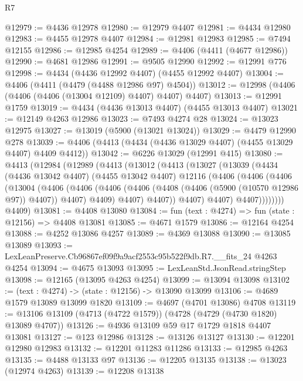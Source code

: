 \begin{lexlean}{R7}
\begin{coremodule}
@12979 := @4436 @12978
@12980 := @12979 @4407
@12981 := @4434 @12980
@12983 := @4455 @12978 @4407
@12984 := @12981 @12983
@12985 := @7494 @12155
@12986 := @12985 @4254
@12989 := @4406 (@4411 (@4677 @12986))
@12990 := @4681 @12986
@12991 := @9505 @12990
@12992 := @12991 @776
@12998 := @4434 (@4436 @12992 @4407) (@4455 @12992 @4407)
@13004 := @4406 (@4411 (@4479 (@4488 @12986 @97) @4504))
@13012 := @12998 (@4406 (@4406 (@4406 (@13004 @12109) @4407) @4407) @4407)
@13013 := @12991 @1759
@13019 := @4434 (@4436 @13013 @4407) (@4455 @13013 @4407)
@13021 := @12149 @4263 @12986
@13023 := @7493 @4274 @28
@13024 := @13023 @12975
@13027 := @13019 (@5900 (@13021 @13024))
@13029 := @4479 @12990 @278
@13039 := @4406 (@4413 (@4434 (@4436 @13029 @4407) (@4455 @13029 @4407) @4409 @4412))
@13042 := @6226 @13029 (@12991 @415)
@13080 := @4413
    (@12984
      (@12989
        (@4413
          (@13012
            (@4413
              (@13027
                (@13039
                  (@4434
                    (@4436 @13042 @4407)
                    (@4455 @13042 @4407)
                    @12116
                    (@4406
                      (@4406
                        (@4406
                          (@13004
                            (@4406
                              (@4406
                                (@4406
                                  (@4406 (@4408 (@4406 (@5900 (@10570 @12986 @97)) @4407)) @4407)
                                  @4409)
                                @4407)
                              @4407))
                          @4407)
                        @4407)
                      @4407))))))))
      @4409)
@13081 := @4408 @13080
@13084 := fun (text : @4274) => fun (state : @12156) => @4408 @13081
@13085 := @4671 @1579
@13086 := @12164 @4254
@13088 := @4252 @13086 @4257
@13089 := @4369 @13088
@13090 := @13085 @13089
@13093 := LexLeanPreserve.Cb96867ef09f9a9acf2553c95b522f9db.R7.__fits_24 @4263 @4254
@13094 := @4675 @13093
@13095 := LexLeanStd.JsonRead.stringStep
@13098 := @12165 (@13095 @4263 @4254)
@13099 := @13094 @13098
@13102 := (text : @4274) -> (state : @12156) -> @13090 @13099
@13106 := @4689 @1579 @13089 @13099 @1820
@13109 := @4697 (@4701 @13086) @4708
@13119 := @13106 @13109 (@4713 (@4722 @1579)) (@4728 (@4729 (@4730 @1820) @13089 @4707))
@13126 := @4936 @13109 @59 @17 @1729 @1818 @4407 @13081
@13127 := @123 @12986
@13128 := @13126 @13127
@13130 := @12201 @12980 @12983
@13132 := @12201 @11283 @11286
@13133 := @12985 @4263
@13135 := @4488 @13133 @97
@13136 := @12205 @13135
@13138 := @13023 (@12974 @4263)
@13139 := @12208 @13138

\end{coremodule}
\end{lexlean}
